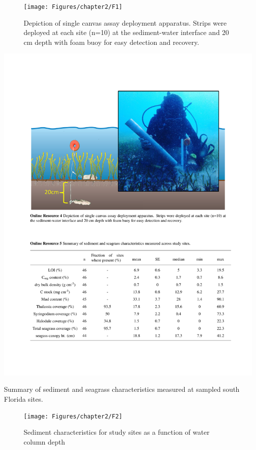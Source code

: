 \begin{figure}[t]
  \centering
   \texttt{[image: Figures/chapter2/F1]}
\caption[Canvas assay deployment apparatus]{Depiction of single canvas assay deployment apparatus. Strips were deployed at each site (n=10) at the sediment-water interface and 20 cm depth with foam buoy for easy detection and recovery.}
  \label{fig:2F1}
\end{figure}

\begin{table}[t]
  \centering
  \includegraphics[width=.99\textwidth,clip, trim={1.7cm 14.2cm 1.8cm 2.6cm}]{Figures/chapter2/T3}
\caption[Summary of sediment and seagrass characteristics.]{Summary of sediment and seagrass characteristics measured at sampled south Florida sites.}
  \label{table:2T3}
\end{table}

\begin{figure}[t]
  \centering
  \texttt{[image: Figures/chapter2/F2]}
\caption[Sediment characteristics for study sites as a function of water column depth]{Sediment characteristics for study sites as a function of water column depth}
  \label{fig:2F2}
\end{figure}


